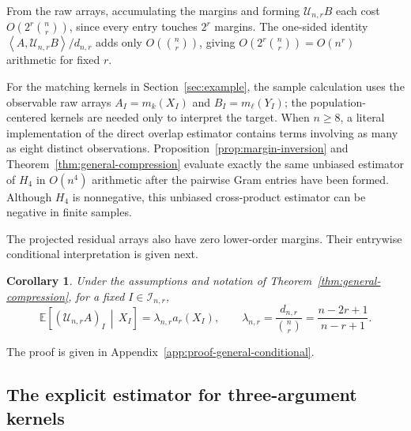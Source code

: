 \documentclass[11pt]{article}
\theoremstyle{plain}
\newtheorem{corollary}[theorem]{Corollary}
\theoremstyle{definition}
\theoremstyle{remark}
\newcommand{\E}{\mathbb E}
\newcommand{\cI}{\mathcal I}
\newcommand{\cU}{\mathcal U}
\newcommand{\inner}[2]{\left\langle #1,#2\right\rangle}
\newcommand{\given}{\,\middle|\,}
\begin{document}
From the raw arrays, accumulating the margins and forming $\cU_{n,r}B$ each
cost $O(2^r\binom nr)$, since every entry touches $2^r$ margins.  The one-sided
identity $\inner{A}{\cU_{n,r}B}/d_{n,r}$ adds only $O(\binom nr)$, giving
$O(2^r\binom nr)=O(n^r)$ arithmetic for fixed $r$.

For the matching kernels in Section~\ref{sec:example}, the sample
calculation uses the observable raw arrays $A_I=m_k(X_I)$ and
$B_I=m_\ell(Y_I)$; the population-centered kernels are needed only to
interpret the target.  When $n\ge8$, a literal implementation of the direct
overlap estimator contains terms involving as many as eight distinct
observations.  Proposition~\ref{prop:margin-inversion} and
Theorem~\ref{thm:general-compression} evaluate exactly the same unbiased
estimator of $H_4$ in $O(n^4)$ arithmetic after the pairwise Gram entries have
been formed.  Although $H_4$ is nonnegative, this unbiased cross-product
estimator can be negative in finite samples.


The projected residual arrays also have zero lower-order margins.  Their
entrywise conditional interpretation is given next.

\begin{corollary}
\label{cor:general-conditional}
Under the assumptions and notation of Theorem~\ref{thm:general-compression},
for a fixed $I\in\cI_{n,r}$,
\begin{equation}\label{eq:general-conditional}
 \E\left[(\cU_{n,r}A)_I\given X_I\right]
 =\lambda_{n,r}a_r(X_I),
 \qquad
 \lambda_{n,r}
 =\frac{d_{n,r}}{\binom nr}
 =\frac{n-2r+1}{n-r+1}.
\end{equation}
\end{corollary}

\noindent The proof is given in
Appendix~\ref{app:proof-general-conditional}.


\subsection{\texorpdfstring{{The explicit estimator for three-argument kernels}}{The explicit estimator for three-argument kernels}}
\end{document}
